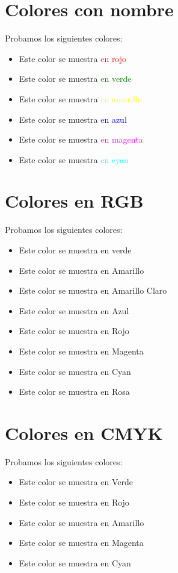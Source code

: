 \documentclass[10pt,a4paper]{article}
\begin{document}
\section{Colores con nombre}
Probamos los siguientes colores:
\begin{itemize}
 \item Este color se muestra \textcolor{red}{en rojo}
 \item Este color se muestra \textcolor{green}{en verde}
 \item Este color se muestra \textcolor{yellow}{en amarillo}
 \item Este color se muestra \textcolor{blue}{en azul}
 \item Este color se muestra \textcolor{magenta}{en magenta}
 \item Este color se muestra \textcolor{cyan}{en cyan}
\end{itemize}
\section{Colores en RGB}
Probamos los siguientes colores:
\begin{itemize}
 \item Este color se muestra \textcolor[rgb]{0,1,0}{en verde}
 \item Este color se muestra \textcolor[rgb]{1,1,0}{en Amarillo}
 \item Este color se muestra \textcolor[rgb]{0.7,0.7,0}{en Amarillo Claro}
 \item Este color se muestra \textcolor[rgb]{0,0,1}{en Azul}
 \item Este color se muestra \textcolor[rgb]{1,0,0}{en Rojo}
 \item Este color se muestra \textcolor[rgb]{1,0,0.7}{en Magenta}
  \item Este color se muestra \textcolor[rgb]{0,0.7,1}{en Cyan}
  \item Este color se muestra \textcolor[rgb]{1,0,1}{en Rosa}
\end{itemize}
\section{Colores en CMYK}
Probamos los siguientes colores:
\begin{itemize}
 \item Este color se muestra \textcolor[cmyk]{1,0,1,0}{en Verde}
 \item Este color se muestra \textcolor[cmyk]{0,1,1,0}{en Rojo}
 \item Este color se muestra \textcolor[cmyk]{0,0,1,0}{en Amarillo}
 \item Este color se muestra \textcolor[cmyk]{0,1,0,0}{en Magenta}
  \item Este color se muestra \textcolor[cmyk]{1,0,0,0}{en Cyan}
\end{itemize}
\end{document}

